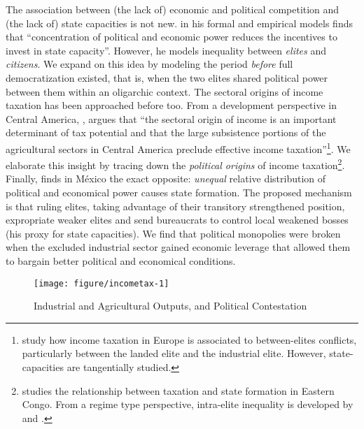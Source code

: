 \documentclass[onesided]{article}\usepackage[]{graphicx}\usepackage[]{color}
\makeatletter
\def\maxwidth{ %
  \ifdim\Gin@nat@width>\linewidth
    \linewidth
  \else
    \Gin@nat@width
  \fi
}
\newenvironment{knitrout}{}{} %
\makeatother
\begin{document}
The association between (the lack of) economic and political competition and (the lack of) state capacities is not new. \citet[p. 40]{Cardenas2010} in his formal and empirical models finds that ``concentration of political and economic power reduces the incentives to invest in state capacity''. However, he models inequality between \emph{elites} and \emph{citizens}. We expand on this idea by modeling the period \emph{before} full democratization existed, that is, when the two elites shared political power between them within an oligarchic context. The sectoral origins of income taxation has been approached before too. From a development perspective in Central America,  \citet[p. 55]{Best1976}, argues that ``the sectoral origin of income is an important determinant of tax potential and that the large subsistence portions of the agricultural sectors in Central America preclude effective income taxation''\footnote{
	\citet[]{Mares2015} study how income taxation in Europe is associated to between-elites conflicts, particularly between the landed elite and the industrial elite. However, state-capacities are tangentially studied.
	}. We elaborate this insight by tracing down the \emph{political origins} of income taxation\footnote{
	\citet{SanchezdelaSierra2014} studies the relationship between taxation and state formation in Eastern Congo. From a regime type perspective, intra-elite inequality is developed by \citet[Ch. 9]{Acemoglu:1996rm} and  \citet[]{Ansell:2014ty}.
	}. Finally, \citet[]{Garfias2015} finds in M\'exico the exact opposite: \emph{unequal} relative distribution of political and economical power causes state formation. The proposed mechanism is that ruling elites, taking advantage of their transitory strengthened  position, expropriate weaker elites and send bureaucrats to control local weakened bosses (his proxy for state capacities). We find that political monopolies were broken when the excluded industrial sector gained economic leverage that allowed them to bargain better political and economical conditions.



\begin{knitrout}
\color{fgcolor}\begin{figure}[H]

{\centering \texttt{[image: figure/incometax-1]} 

}

\caption[Industrial and Agricultural Outputs, and Political Contestation]{Industrial and Agricultural Outputs, and Political Contestation}\label{fig:incometax}
\end{figure}


\end{knitrout}
\end{document}
